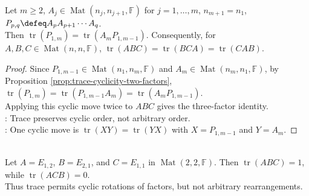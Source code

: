 \begin{proposition} \label{prop:trace-cyclic-products} \\
Let $m\geq 2$, $A_j\in\operatorname{Mat}(n_j,n_{j+1},\mathbb{F})$ for $j=1,\ldots,m$, $n_{m+1}=n_1$, $P_{p,q}\defeq A_pA_{p+1}\cdots A_q$.\\
Then $\operatorname{tr}(P_{1,m})=\operatorname{tr}(A_mP_{1,m-1})$. Consequently, for $A,B,C\in\operatorname{Mat}(n,n,\mathbb{F})$, $\operatorname{tr}(ABC)=\operatorname{tr}(BCA)=\operatorname{tr}(CAB)$.
\begin{proof}
Since $P_{1,m-1}\in\operatorname{Mat}(n_1,n_m,\mathbb{F})$ and $A_m\in\operatorname{Mat}(n_m,n_1,\mathbb{F})$, by Proposition \ref{prop:trace-cyclicity-two-factors}, $\operatorname{tr}(P_{1,m}) =\operatorname{tr}(P_{1,m-1}A_m) =\operatorname{tr}(A_mP_{1,m-1})$.\\
Applying this cyclic move twice to $ABC$ gives the three-factor identity.\\
: Trace preserves cyclic order, not arbitrary order.\\
: One cyclic move is $\operatorname{tr}(XY)=\operatorname{tr}(YX)$ with $X=P_{1,m-1}$ and $Y=A_m$.
\end{proof}
\end{proposition}

\begin{example} \label{ex:trace-cyclicity-not-arbitrary-permutation} \\
Let $A=E_{1,2}$, $B=E_{2,1}$, and $C=E_{1,1}$ in $\operatorname{Mat}(2,2,\mathbb{F})$. Then $\operatorname{tr}(ABC)=1$, while $\operatorname{tr}(ACB)=0$.\\
Thus trace permits cyclic rotations of factors, but not arbitrary rearrangements.
\end{example}

